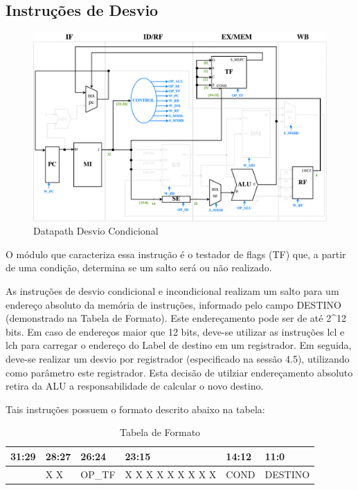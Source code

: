 \documentclass{report}
\begin{document}
\subsection{Instruções de Desvio}
\begin{figure}[H]
\centering
\includegraphics[width=\textwidth]{./pictures/DatapathDES.pdf}
\caption{Datapath Desvio Condicional}
\end{figure}

O módulo que caracteriza essa instrução é o testador de flags (TF) que, a partir de uma condição, determina se um salto será ou não realizado.

As instruções de desvio condicional e incondicional realizam um salto para um endereço absoluto da memória de instruções, informado pelo campo DESTINO (demonstrado na Tabela de Formato). Este endereçamento pode ser de até 2\^{}12 bits. Em caso de endereços maior que 12 bits, deve-se utilizar as instruções lcl e lch para carregar o endereço do Label de destino em um registrador. Em seguida, deve-se realizar um desvio por registrador (especificado na sessão 4.5), utilizando como parâmetro este registrador. Esta decisão de utilziar endereçamento absoluto retira da ALU a responsabilidade de calcular o novo destino.

Tais instruções possuem o formato descrito abaixo na tabela:
\FloatBarrier
\begin{table}[H]
  \begin{center}
    \begin{tabular}[pos]{|>{\centering\arraybackslash}m{33pt}|>{\centering\arraybackslash}m{28pt}|>{\centering\arraybackslash}m{33pt}|>{\centering\arraybackslash}m{105pt}|>{\centering\arraybackslash}m{33pt}|>{\centering\arraybackslash}m{120pt}|} \hline
      \cellcolor[gray]{0.9}\textbf{31:29} & \cellcolor[gray]{0.9}\textbf{28:27} & \cellcolor[gray]{0.9}\textbf{26:24} & \cellcolor[gray]{0.9}\textbf{23:15} & \cellcolor[gray]{0.9}\textbf{14:12} & \cellcolor[gray]{0.9}\textbf{11:0} \\ \hline
        000       & X X       & OP\_TF       & X X X X X X X X X      & COND       & DESTINO \\ \hline
    \end{tabular}
    \caption{Tabela de Formato}
  \end{center}
\end{table}  
\end{document}
